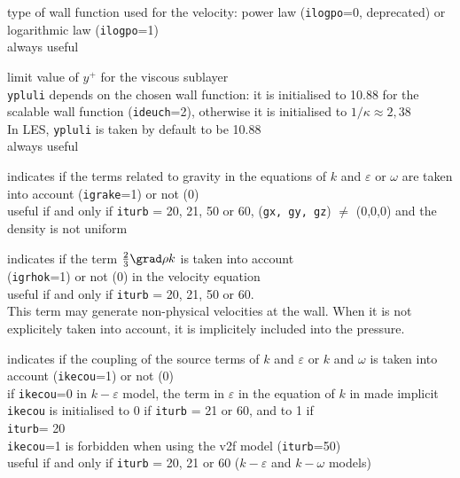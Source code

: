 {type of wall function used for the velocity: power law
({\tt ilogpo}=0, deprecated) or logarithmic law ({\tt ilogpo}=1)\\
always useful}

{limit value of $y^+$ for the viscous sublayer\\
{\tt ypluli} depends on the chosen wall function: it is
initialised to 10.88 for the scalable wall function ({\tt ideuch}=2),
otherwise it is initialised to $1/\kappa\approx 2,38$\\
In LES, {\tt ypluli} is taken by default to be 10.88\\
always useful}


{indicates if the terms related to gravity in the
equations of $k$ and $\varepsilon$ or $\omega$ are taken into account
({\tt igrake}=1) or not (0)\\
useful if and only if {\tt iturb} = 20, 21, 50 or 60, ({\tt gx, gy, gz})
$\ne$ (0,0,0) and the density is not uniform}

{indicates if the term $\frac{2}{3}\grad \rho k$
is taken into account\\ ({\tt igrhok}=1) or not (0) in the velocity
equation\\
useful if and only if {\tt iturb} = 20, 21, 50 or 60.\\
This term may generate
non-physical velocities at the wall. When it is not explicitely taken into
account, it is implicitely included into the pressure.}

{indicates if the coupling of the source terms of
$k$ and $\varepsilon$ or $k$ and $\omega$ is taken into account
({\tt ikecou}=1) or not (0)\\
if {\tt ikecou}=0 in $k-\varepsilon$ model, the term in $\varepsilon$ in the
equation of $k$ in made implicit\\
{\tt ikecou} is initialised to 0 if {\tt iturb} = 21 or 60,
and to 1 if\\
{\tt iturb}= 20\\
{\tt ikecou}=1 is forbidden when using the v2f model
({\tt iturb}=50)\\
useful if and only if {\tt iturb} = 20, 21 or 60 ($k-\varepsilon$ and
$k-\omega$ models)}

